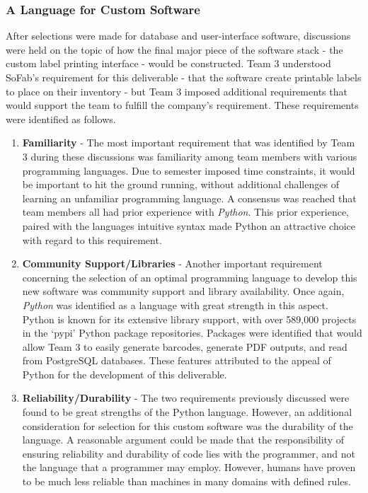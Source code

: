 \documentclass{article}
\begin{document}
\subsubsection{A Language for Custom Software}
After selections were made for database and user-interface software, discussions were held on the topic of how the final major piece 
of the software stack - the custom label printing interface - would be constructed. Team 3 understood SoFab's requirement for this 
deliverable - that the software create printable labels to place on their inventory - but Team 3 imposed additional requirements
that would support the team to fulfill the company's requirement. These requirements were identified as follows. 
\begin{enumerate}
    \item \textbf{Familiarity} - The most important requirement that was identified by Team 3 during these discussions was familiarity 
        among team members with various programming languages. Due to semester imposed time constraints, it would be important to hit 
        the ground running, without additional challenges of learning an unfamiliar programming language. A consensus was reached that 
        team members all had prior experience with \textit{Python}. This prior experience, paired with the languages intuitive syntax
        made Python an attractive choice with regard to this requirement. 
    \item \textbf{Community Support\slash Libraries} - Another important requirement concerning the selection of an optimal programming 
        language to develop this new software was community support and library availability. Once again, \textit{Python} was identified
        as a language with great strength in this aspect. Python is known for its extensive library support, with over 589,000 projects
        in the `pypi' Python package repositories. \cite{pypi} Packages were identified that would allow Team 3 to easily generate 
        barcodes, generate PDF outputs, and read from PostgreSQL databases. These features attributed to the appeal of Python for the 
        development of this deliverable. 
    \item \textbf{Reliability\slash Durability} - The two requirements previously discussed were found to be great strengths of the 
        Python language. However, an additional consideration for selection for this custom software was the durability of the language. 
        A reasonable argument could be made that the responsibility of ensuring reliability and durability of code lies with the 
        programmer, and not the language that a programmer may employ. However, humans have proven to be much less reliable than 
        machines in many domains with defined rules. 


\end{enumerate}
\end{document}
